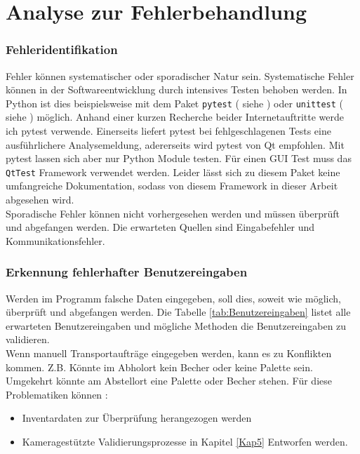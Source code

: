 \chapter{Analyse zur Fehlerbehandlung}\label{Fehlerbehandlung}

\subsection{Fehleridentifikation}

Fehler können systematischer oder sporadischer Natur sein.
Systematische Fehler können in der Softwareentwicklung durch intensives Testen behoben werden.
In Python ist dies beispielsweise mit dem Paket \verb|pytest| ( siehe \cite{pytestHP}) oder \verb|unittest| ( siehe \cite{unittestHP}) möglich.
Anhand einer kurzen Recherche beider Internetauftritte werde ich pytest verwende.
Einerseits liefert pytest bei fehlgeschlagenen Tests eine ausführlichere Analysemeldung, adererseits wird pytest von Qt empfohlen.
Mit pytest lassen sich aber nur Python Module testen.
Für einen GUI Test muss das \verb|QtTest| Framework verwendet werden.
Leider lässt sich zu diesem Paket keine umfangreiche Dokumentation, sodass von diesem Framework in dieser Arbeit abgesehen wird.\\

\vspace{1cm}
Sporadische Fehler können nicht vorhergesehen werden und müssen überprüft und abgefangen werden.
Die erwarteten Quellen sind Eingabefehler und Kommunikationsfehler.

\subsection{Erkennung fehlerhafter Benutzereingaben}

Werden im Programm falsche Daten eingegeben, soll dies, soweit wie möglich, überprüft und abgefangen werden.
Die Tabelle \ref{tab:Benutzereingaben} listet alle erwarteten Benutzereingaben und mögliche Methoden die Benutzereingaben
zu validieren. \\



\vspace{1cm}
Wenn manuell Transportaufträge eingegeben werden, kann es zu Konflikten kommen.
Z.B. Könnte im Abholort kein Becher oder keine Palette sein.
Umgekehrt könnte am Abstellort eine Palette oder Becher stehen.
Für diese Problematiken können :
\begin{itemize}
    \item Inventardaten zur Überprüfung herangezogen werden
    \item Kameragestützte Validierungsprozesse in Kapitel \ref{Kap5} Entworfen werden.
\end{itemize}